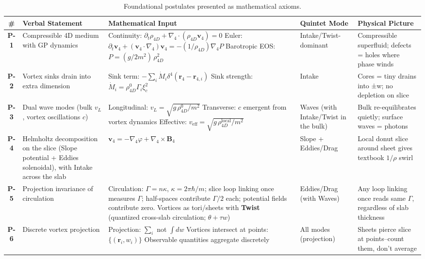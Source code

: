 \begin{table}[H]
\centering
\begingroup
\small
\begin{tabularx}{\textwidth}{|c|X|X|X|X|}
\hline
\# & Verbal Statement & Mathematical Input & Quintet Mode & Physical Picture \\
\hline
\textbf{P-1} & Compressible 4D medium with GP dynamics & Continuity: $\partial_t \rho_{4D} + \nabla_4 \cdot (\rho_{4D} \mathbf{v}_4) = 0$ Euler: $\partial_t \mathbf{v}_4 + (\mathbf{v}_4 \cdot \nabla_4) \mathbf{v}_4 = -(1/\rho_{4D}) \nabla_4 P$ Barotropic EOS: $P = (g/2m^{2})\,\rho_{4D}^{2}$ & Intake/Twist-dominant & Compressible superfluid; defects = holes where phase winds \\
\hline
\textbf{P-2} & Vortex sinks drain into extra dimension & Sink term: $-\sum_i \dot{M}_i \delta^4(\mathbf{r}_4 - \mathbf{r}_{4,i})$ Sink strength: $\dot{M}_i = \rho_{4D}^0 \Gamma_i \xi_c^2$ & Intake & Cores = tiny drains into ±w; no depletion on slice \\
\hline
\textbf{P-3} & Dual wave modes (bulk $v_L$, vortex oscillations $c$) & Longitudinal: $v_L = \sqrt{g \, \rho_{4D}^0 / m^{2}}$ Transverse: $c$ emergent from vortex dynamics Effective: $v_{\text{eff}} = \sqrt{g \, \rho_{4D}^{\text{local}} / m^{2}}$ & Waves (with Intake/Twist in the bulk) & Bulk re-equilibrates quietly; surface waves = photons \\
\hline
\textbf{P-4} & Helmholtz decomposition on the slice (Slope potential + Eddies solenoidal), with Intake across the slab & $\mathbf{v}_4 = -\nabla_4 \varphi + \nabla_4 \times \mathbf{B}_4$ & Slope + Eddies/Drag & Local donut slice around sheet gives textbook $1/\rho$ swirl \\
\hline
\textbf{P-5} & Projection invariance of circulation & Circulation: $\Gamma = n \kappa$, $\kappa = 2 \pi \hbar / m$; slice loop linking once measures $\Gamma$; half-spaces contribute $\Gamma/2$ each; potential fields contribute zero. Vortices as tori/sheets with \textbf{Twist} (quantized cross-slab circulation; $\theta+\tau w$) & Eddies/Drag (with Waves) & Any loop linking once reads same $\Gamma$, regardless of slab thickness \\
\hline
\textbf{P-6} & Discrete vortex projection & Projection: $\sum_i$ not $\int dw$ Vortices intersect at points: $\{(\mathbf{r}_i, w_i)\}$ Observable quantities aggregate discretely & All modes (projection) & Sheets pierce slice at points--count them, don't average \\
\hline
\end{tabularx}
\endgroup
\caption{Foundational postulates presented as mathematical axioms.}
\label{tab:postulates}
\end{table}

